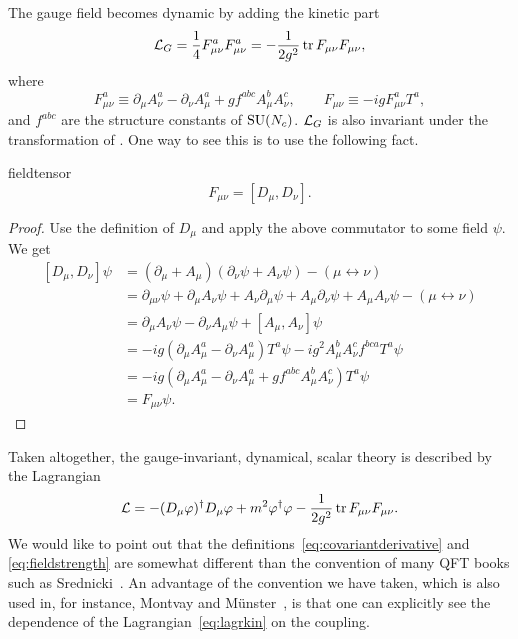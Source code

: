 The gauge field becomes dynamic by adding the kinetic part
\begin{equation}\label{eq:lagrkin}
  \mathcal{L}_G=\frac{1}{4} F_{\mu\nu}^{a}F_{\mu\nu}^{a}
         =-\frac{1}{2g^2}\tr F_{\mu\nu}F_{\mu\nu},
\end{equation}
where 
\begin{equation}\label{eq:fieldstrength}
          F_{\mu\nu}^a\equiv \partial_\mu A_\nu^a-\partial_\nu A_\mu^a
                        +gf^{abc}A_\mu^b A_\nu^c,\qquad
  F_{\mu\nu}\equiv-igF_{\mu\nu}^aT^a,
\end{equation} 
and $f^{abc}$ are the structure constants of $\operatorname{SU}(N_c)$.
$\mathcal{L}_{G}$ is also invariant 
under the transformation of . One way to see this
is to use the following fact.
\begin{proposition}{}{fieldtensor}
  $$F_{\mu\nu}=\left[D_\mu,D_\nu\right].$$
  \begin{proof}
    Use the definition of $D_\mu$ and apply the above commutator to some
    field $\psi$. We get
    \begin{equation*}
    \begin{aligned}
      \left[D_\mu,D_\nu\right]\psi
         &=(\partial_\mu+A_\mu)(\partial_\nu\psi+A_\nu\psi)
                     -(\mu\leftrightarrow\nu)\\
         &=\partial_{\mu\nu}\psi+\partial_\mu A_\nu\psi
           +A_\nu\partial_\mu\psi+A_\mu\partial_\nu\psi
           +A_\mu A_\nu\psi-(\mu\leftrightarrow\nu)\\
         &=\partial_\mu A_\nu\psi-\partial_\nu A_\mu\psi
           +\left[A_\mu,A_\nu\right]\psi\\
         &=-ig\left(\partial_\mu A_\mu^a-\partial_\nu A_\mu^a\right)T^a\psi
           -ig^2A_\mu^bA_\nu^cf^{bca}T^a\psi\\
         &=-ig\left(\partial_\mu A_\mu^a-\partial_\nu A_\mu^a
                    +gf^{abc}A_\mu^bA_\nu^c\right)T^a\psi\\
         &=F_{\mu\nu}\psi.
    \end{aligned}
    \end{equation*}
  \end{proof}
\end{proposition}

Taken altogether, the gauge-invariant, dynamical, 
scalar theory is described by the Lagrangian
\begin{equation}
  \mathcal{L}=-(D_\mu\varphi)^\dagger D_\mu\varphi
                +m^2\varphi^\dagger\varphi
                -\frac{1}{2g^2}\tr F_{\mu\nu}F_{\mu\nu}.
\end{equation}
We would like
to point out that the definitions~\eqref{eq:covariantderivative} and
\eqref{eq:fieldstrength} are somewhat different than the convention
of many QFT books such as Srednicki~\cite{srednicki_quantum_2007}.
An advantage of the convention we have taken, which is also used in, 
for instance, Montvay and
M\"unster~\cite{montvay_quantum_1994}, is that one can explicitly see the
dependence of the Lagrangian~\eqref{eq:lagrkin} on the coupling. 

